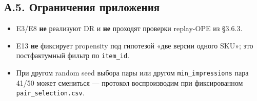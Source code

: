 \subsection*{А.5. Ограничения приложения}\label{ux430.5.-ux43eux433ux440ux430ux43dux438ux447ux435ux43dux438ux44f-ux43fux440ux438ux43bux43eux436ux435ux43dux438ux44f}

\begin{itemize}
\tightlist
\item
  E3/E8 \textbf{не} реализуют DR \cite{ref27} и \textbf{не} проходят проверки replay-OPE из §3.6.3.
\item
  E13 \textbf{не} фиксирует propensity под гипотезой «две версии одного SKU»; это постфактумный фильтр по \texttt{item\_id}.
\item
  При другом random seed выбора пары или другом \texttt{min\_impressions} пара 41/50 может смениться --- протокол воспроизводим при фиксированном \texttt{pair\_selection.csv}.
\end{itemize}
